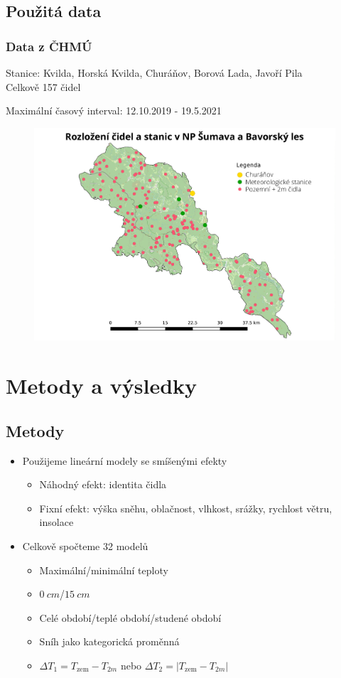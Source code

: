 \documentclass[
	11pt, %
]{beamer}
\begin{document}

\subsection{Použitá data}

\begin{frame}
	\frametitle{Data z ČHMÚ}
	Stanice: Kvilda, Horská Kvilda, Churáňov, Borová Lada, Javoří Pila\\
	Celkově 157 čidel

	Maximální časový interval: 12.10.2019 - 19.5.2021
	\begin{figure}
		\includegraphics[width=0.7\linewidth]{rozlozenicidel.pdf}
	\end{figure}
\end{frame}


\section{Metody a výsledky}

\subsection{Metody}

\begin{frame}
	\begin{itemize}
		\item Použijeme lineární modely se smíšenými efekty
		\begin{itemize}
			\item Náhodný efekt: identita čidla
			\item Fixní efekt: výška sněhu, oblačnost, vlhkost, srážky, rychlost větru, insolace
		\end{itemize}
	\item Celkově spočteme 32 modelů 
		\begin{itemize}
				\item Maximální/minimální teploty
				\item $\SI{0}{cm}$/$\SI{15}{cm}$
				\item Celé období/teplé období/studené období
				\item Sníh jako kategorická proměnná
				\item $\Delta T_1 = T_{\text{zem}}-T_{2m}$ nebo $\Delta T_2 = \left|T_{\text{zem}}-T_{2m}\right|$
		\end{itemize}
	\end{itemize}
\end{frame}
\end{document}
